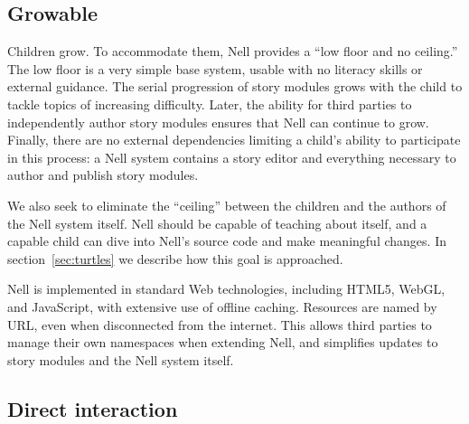 \documentclass[preprint]{sig-alternate}
\begin{document}
\subsection{Growable}


Children grow. To accommodate them, Nell provides a ``low floor and
no ceiling.''  The low
floor is a very simple base system, usable with no literacy skills or
external guidance.  The serial progression of story modules grows with
the child to tackle topics of increasing difficulty.
Later, the ability for third
parties to independently author story modules ensures that
Nell can continue to grow.  Finally, there are no external dependencies
limiting a child's ability to participate in this process: a Nell
system contains a story editor and everything necessary to
author and publish story modules.

We also seek to eliminate the ``ceiling'' between the children and
the authors of the Nell system itself.  Nell should be capable of
teaching about itself, and a capable child can dive into Nell's source
code and make meaningful changes.  In section~\ref{sec:turtles} we
describe how this goal is approached.

Nell is implemented in standard Web technologies, including HTML5,
WebGL, and JavaScript, with extensive use of offline caching.
Resources are named by URL, even when disconnected from the
internet.  This allows third parties to manage their own namespaces
when extending Nell, and simplifies updates to story modules and
the Nell system itself.



\subsection{Direct interaction}
\end{document}
